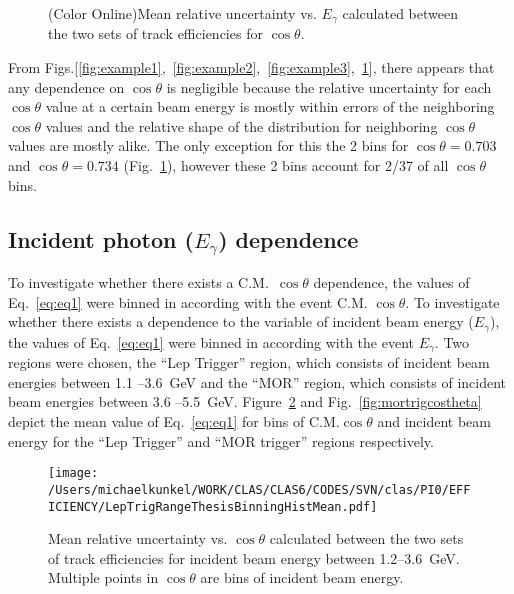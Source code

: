 		\begin{figure}%
			\centering
			
			\caption{(Color Online)Mean relative uncertainty vs. $E_{\gamma}$ calculated between the two sets of track efficiencies for $\cos \theta$.}%
			\label{fig:example4}%
		\end{figure}		
		From Figs.[\ref{fig:example1},~\ref{fig:example2},~\ref{fig:example3},~\ref{fig:example4}], there appears that any dependence on $\cos \theta$ is negligible because the relative uncertainty for each $\cos \theta$ value at a certain beam energy is mostly within errors of the neighboring $\cos \theta$ values and the relative shape of the distribution for neighboring $\cos \theta$ values are mostly alike. The only exception for this the 2 bins for $\cos \theta = 0.703$ and $\cos \theta = 0.734$ (Fig.~\ref{fig:example4}), however these 2 bins account for 2/37 of all $\cos \theta $ bins.
		\FloatBarrier
		\subsection*{ Incident photon ($E_{\gamma}$) dependence}
		To investigate whether there exists a C.M.~$\cos \theta$ dependence, the values of Eq.~\ref{eq:eq1} were binned in according with the event C.M. $\cos \theta$.
		To investigate whether there exists a dependence to the variable of incident beam energy ($E_{\gamma}$), the values of Eq.~\ref{eq:eq1} were binned in according with the event $E_{\gamma}$. Two regions were chosen, the ``Lep Trigger'' region, which consists of incident beam energies between 1.1 --3.6~GeV and the ``MOR'' region, which consists of incident beam energies between 3.6 --5.5~GeV.
		Figure~\ref{fig:leptrigcostheta} and Fig.~\ref{fig:mortrigcostheta} depict the mean value of Eq.~\ref{eq:eq1} for bins of C.M.$\cos \theta$ and incident beam energy for the ``Lep Trigger'' and ``MOR trigger'' regions respectively. 
		\begin{figure}[h!]\begin{center}
				\texttt{[image: /Users/michaelkunkel/WORK/CLAS/CLAS6/CODES/SVN/clas/PI0/EFFICIENCY/LepTrigRangeThesisBinningHistMean.pdf]}
				\caption{Mean relative uncertainty vs. $\cos \theta$ calculated between the two sets of track efficiencies for incident beam energy between 1.2--3.6~GeV. Multiple points in $\cos \theta$ are bins of incident beam energy. }\label{fig:leptrigcostheta}
			\end{center}\end{figure}
			
